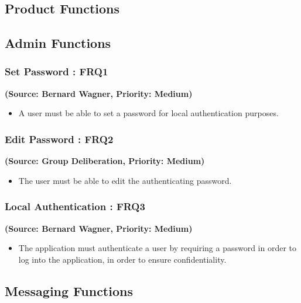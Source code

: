 \subsection{Product Functions}


\normalsize
\vspace{12pt}

\subsection{Admin Functions}

\subsubsection{Set Password : FRQ1}
\textbf{(Source: Bernard Wagner, Priority: Medium)}
\begin{itemize}
\item A user must be able to set a password for local authentication purposes.
\end{itemize}
\subsubsection{Edit Password : FRQ2}
\textbf{(Source: Group Deliberation, Priority: Medium)}
\begin{itemize}
\item The user must be able to edit the authenticating password.
\end{itemize}
\subsubsection{Local Authentication : FRQ3}%
\textbf{(Source: Bernard Wagner, Priority: Medium)}
\begin{itemize}
\item The application must authenticate a user by requiring a password in order to log into the application, in order to ensure confidentiality.
\end{itemize}

\subsection{Messaging Functions}

